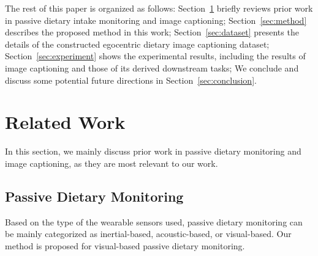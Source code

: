 \documentclass[journal]{IEEEtran}
\begin{document}
The rest of this paper is organized as follows: Section~\ref{sec:related_work} briefly reviews prior work in passive dietary intake monitoring and image captioning; Section~\ref{sec:method} describes the proposed method in this work; Section~\ref{sec:dataset} presents the details of the constructed egocentric dietary image captioning dataset; Section~\ref{sec:experiment} shows the experimental results, including the results of image captioning and those of its derived downstream tasks; We conclude and discuss some potential future directions in Section~\ref{sec:conclusion}.






\section{Related Work}\label{sec:related_work}

In this section, we mainly discuss prior work in passive dietary monitoring and image captioning, as they are most relevant to our work.



\subsection{Passive Dietary Monitoring}



Based on the type of the wearable sensors used, passive dietary monitoring can be mainly categorized as inertial-based, acoustic-based, or visual-based. Our method is proposed for visual-based passive dietary monitoring.
\end{document}
